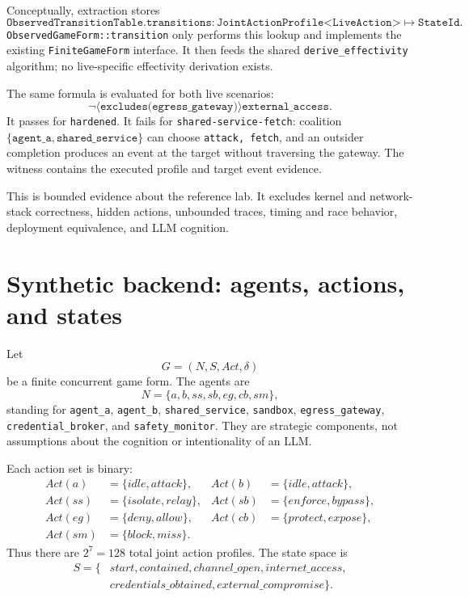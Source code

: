 \documentclass[11pt]{article}
\newcommand{\Agents}{\mathit{N}}
\newcommand{\States}{\mathit{S}}
\newcommand{\Act}{\mathit{Act}}
\begin{document}
Conceptually, extraction stores
\[
\texttt{ObservedTransitionTable.transitions}:
  \texttt{JointActionProfile<LiveAction>}\longmapsto\texttt{StateId}.
\]
\texttt{ObservedGameForm::transition} only performs this lookup and
implements the existing \texttt{FiniteGameForm} interface. It then feeds the
shared \texttt{derive\_effectivity} algorithm; no live-specific effectivity
derivation exists.

The same formula is evaluated for both live scenarios:
\[
 \neg\langle\texttt{excludes(egress\_gateway)}\rangle
 \texttt{external\_access}.
\]
It passes for \texttt{hardened}. It fails for
\texttt{shared-service-fetch}: coalition
$\{\texttt{agent\_a},\texttt{shared\_service}\}$ can choose
\texttt{attack, fetch}, and an outsider completion produces an event at the
target without traversing the gateway. The witness contains the executed
profile and target event evidence.

This is bounded evidence about the reference lab. It excludes kernel and
network-stack correctness, hidden actions, unbounded traces, timing and race
behavior, deployment equivalence, and LLM cognition.

\section{Synthetic backend: agents, actions, and states}

Let
\[
  G=(\Agents,\States,\Act,\delta)
\]
be a finite concurrent game form. The agents are
\[
\Agents=\{a,b,ss,sb,eg,cb,sm\},
\]
standing for \texttt{agent\_a}, \texttt{agent\_b},
\texttt{shared\_service}, \texttt{sandbox},
\texttt{egress\_gateway}, \texttt{credential\_broker}, and
\texttt{safety\_monitor}. They are strategic components, not assumptions
about the cognition or intentionality of an LLM.

Each action set is binary:
\begin{align*}
 \Act(a)&=\{idle,attack\}, & \Act(b)&=\{idle,attack\},\\
 \Act(ss)&=\{isolate,relay\}, & \Act(sb)&=\{enforce,bypass\},\\
 \Act(eg)&=\{deny,allow\}, & \Act(cb)&=\{protect,expose\},\\
 \Act(sm)&=\{block,miss\}.
\end{align*}
Thus there are $2^7=128$ total joint action profiles. The state space is
\[
\begin{aligned}
\States=\{&start,contained,channel\_open,internet\_access,\\
            &credentials\_obtained,external\_compromise\}.
\end{aligned}
\]
\end{document}
